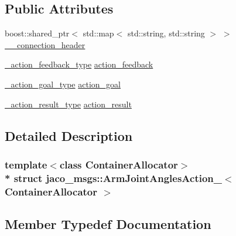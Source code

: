 \subsection*{Public Attributes}
\begin{DoxyCompactItemize}
\item 
boost\+::shared\+\_\+ptr$<$ std\+::map$<$ std\+::string, std\+::string $>$ $>$ \hyperlink{structjaco__msgs_1_1ArmJointAnglesAction___a0c3506236c6ab55f1ea4b1bc4b84436a}{\+\_\+\+\_\+connection\+\_\+header}
\item 
\hyperlink{structjaco__msgs_1_1ArmJointAnglesAction___a18181acdd2f5776a83dd75f0b8a17d2a}{\+\_\+action\+\_\+feedback\+\_\+type} \hyperlink{structjaco__msgs_1_1ArmJointAnglesAction___a4f8f0bee4654093ead1eb43103cc4d86}{action\+\_\+feedback}
\item 
\hyperlink{structjaco__msgs_1_1ArmJointAnglesAction___a096e56f63aae41aad15c7d8d5b5f6d0e}{\+\_\+action\+\_\+goal\+\_\+type} \hyperlink{structjaco__msgs_1_1ArmJointAnglesAction___ae94e8854432290ab918b68cccf5fd63e}{action\+\_\+goal}
\item 
\hyperlink{structjaco__msgs_1_1ArmJointAnglesAction___a24f1e437de783673dbbf81603f3e02a4}{\+\_\+action\+\_\+result\+\_\+type} \hyperlink{structjaco__msgs_1_1ArmJointAnglesAction___a8c8fe221e785eaf52c1651021d5cf6e9}{action\+\_\+result}
\end{DoxyCompactItemize}


\subsection{Detailed Description}
\subsubsection*{template$<$class Container\+Allocator$>$\\*
struct jaco\+\_\+msgs\+::\+Arm\+Joint\+Angles\+Action\+\_\+$<$ Container\+Allocator $>$}



\subsection{Member Typedef Documentation}
